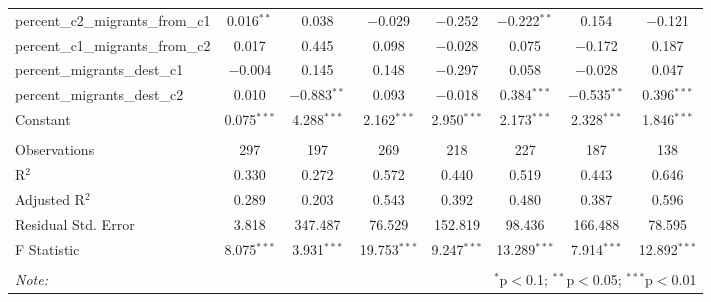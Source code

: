 \begin{table}[!htbp]
\begin{tabular}{@{\extracolsep{5pt}}lccccccc}
  percent\_c2\_migrants\_from\_c1 & 0.016$^{**}$ & 0.038 & $-$0.029 & $-$0.252 & $-$0.222$^{**}$ & 0.154 & $-$0.121 \\ 
  percent\_c1\_migrants\_from\_c2 & 0.017 & 0.445 & 0.098 & $-$0.028 & 0.075 & $-$0.172 & 0.187 \\ 
  percent\_migrants\_dest\_c1 & $-$0.004 & 0.145 & 0.148 & $-$0.297 & 0.058 & $-$0.028 & 0.047 \\ 
  percent\_migrants\_dest\_c2 & 0.010 & $-$0.883$^{**}$ & 0.093 & $-$0.018 & 0.384$^{***}$ & $-$0.535$^{**}$ & 0.396$^{***}$ \\ 
  Constant & 0.075$^{***}$ & 4.288$^{***}$ & 2.162$^{***}$ & 2.950$^{***}$ & 2.173$^{***}$ & 2.328$^{***}$ & 1.846$^{***}$ \\ 
 \hline \\[-1.8ex] 
Observations & 297 & 197 & 269 & 218 & 227 & 187 & 138 \\ 
R$^{2}$ & 0.330 & 0.272 & 0.572 & 0.440 & 0.519 & 0.443 & 0.646 \\ 
Adjusted R$^{2}$ & 0.289 & 0.203 & 0.543 & 0.392 & 0.480 & 0.387 & 0.596 \\ 
Residual Std. Error & 3.818 & 347.487 & 76.529 & 152.819 & 98.436 & 166.488 & 78.595 \\ 
F Statistic & 8.075$^{***}$ & 3.931$^{***}$ & 19.753$^{***}$ & 9.247$^{***}$ & 13.289$^{***}$ & 7.914$^{***}$ & 12.892$^{***}$ \\ 
\hline 
\hline \\[-1.8ex] 
\textit{Note:}  & \multicolumn{7}{r}{$^{*}$p$<$0.1; $^{**}$p$<$0.05; $^{***}$p$<$0.01} \\ 
\end{tabular} 
\end{table} 
